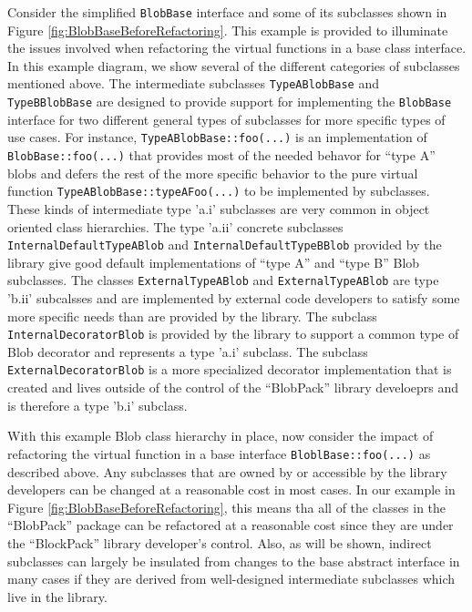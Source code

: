 \documentclass[pdf,ps2pdf,11pt]{SANDreport}
\begin{document}
Consider the simplified {}\texttt{Blob\-Base} interface and some of its
subclasses shown in Figure {}\ref{fig:BlobBaseBeforeRefactoring}.  This
example is provided to illuminate the issues involved when refactoring the
virtual functions in a base class interface.  In this example diagram, we show
several of the different categories of subclasses mentioned above.  The
intermediate subclasses {}\texttt{Type\-A\-Blob\-Base} and
{}\texttt{Type\-B\-Blob\-Base} are designed to provide support for
implementing the {}\texttt{Blob\-Base} interface for two different general
types of subclasses for more specific types of use cases.  For instance,
{}\texttt{Type\-A\-Blob\-Base\-::foo(...)} is an implementation of
{}\texttt{Blob\-Base\-::foo(...)} that provides most of the needed behavor for
``type A'' blobs and defers the rest of the more specific behavior to the pure
virtual function {}\texttt{Type\-A\-Blob\-Base\-::typeAFoo(...)} to be
implemented by subclasses.  These kinds of intermediate type 'a.i' subclasses
are very common in object oriented class hierarchies.  The type 'a.ii'
concrete subclasses {}\texttt{Internal\-Default\-Type\-A\-Blob} and
{}\texttt{Internal\-Default\-Type\-B\-Blob} provided by the library give good
default implementations of ``type A'' and ``type B'' Blob subclasses.  The
classes {}\texttt{External\-Type\-A\-Blob} and
{}\texttt{External\-Type\-A\-Blob} are type 'b.ii' subcalsses and are
implemented by external code developers to satisfy some more specific needs
than are provided by the library.  The subclass
{}\texttt{Internal\-Decorator\-Blob} is provided by the library to support a
common type of Blob decorator and represents a type 'a.i' subclass.  The
subclass {}\texttt{External\-Decorator\-Blob} is a more specialized decorator
implementation that is created and lives outside of the control of the
``BlobPack'' library develoeprs and is therefore a type 'b.i' subclass.

With this example Blob class hierarchy in place, now consider the impact of
refactoring the virtual function in a base interface
{}\texttt{Blobl\-Base\-::foo(...)} as described above.  Any subclasses that
are owned by or accessible by the library developers can be changed at a
reasonable cost in most cases.  In our example in Figure
{}\ref{fig:BlobBaseBeforeRefactoring}, this means tha all of the classes in
the ``BlobPack'' package can be refactored at a reasonable cost since they are
under the ``BlockPack'' library developer's control.  Also, as will be shown,
indirect subclasses can largely be insulated from changes to the base abstract
interface in many cases if they are derived from well-designed intermediate
subclasses which live in the library.
\end{document}
